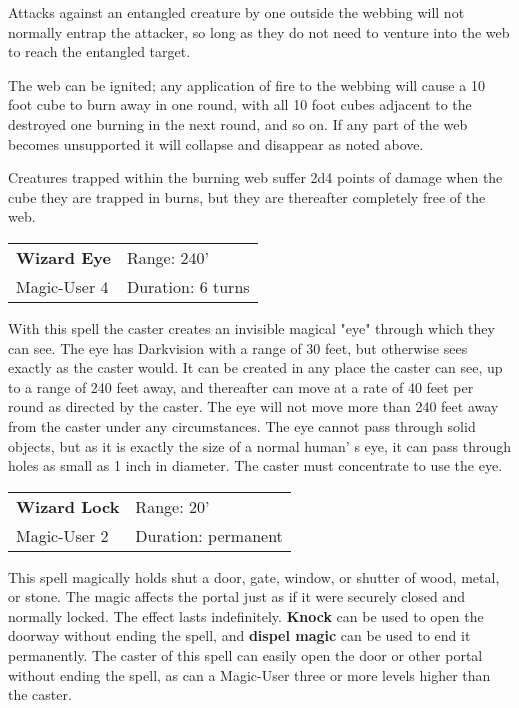 \documentclass[a4paper,twoside,openany,10pt]{book}
\begin{document}
\begin{multicols}{2}
Attacks against an entangled creature by one outside the webbing will not normally entrap the attacker, so long as they do not need to venture into the web to reach the entangled target.

The web can be ignited; any application of fire to the webbing will cause a 10 foot cube to burn away in one round, with all 10 foot cubes adjacent to the destroyed one burning in the next round, and so on. If any part of the web becomes unsupported it will collapse and disappear as noted above.

Creatures trapped within the burning web suffer 2d4 points of damage when the cube they are trapped in burns, but they are thereafter completely free of the web.

\smallskip\begin{flushleft} 
	\begin{tabularx}{0.45\textwidth}{@{}m{3.5cm}m{5.5cm}@{}} 
		\textbf{Wizard Eye} & Range: 240'\\
		Magic-User 4 &Duration: 6 turns\\
	\end{tabularx}\end{flushleft}

With this spell the caster creates an invisible magical "eye" through which they can see. The eye has Darkvision with a range of 30 feet, but otherwise sees exactly as the caster would. It can be created in any place the caster can see, up to a range of 240 feet away, and thereafter can move at a rate of 40 feet per round as directed by the caster. The eye will not move more than 240 feet away from the caster under any circumstances. The eye cannot pass through solid objects, but as it is exactly the size of a normal human' s eye, it can pass through holes as small as 1 inch in diameter. The caster must concentrate to use the eye.

\smallskip\begin{flushleft} 
	\begin{tabularx}{0.45\textwidth}{@{}m{3.5cm}m{5.5cm}@{}} 
		\textbf{Wizard Lock} & Range: 20'\\
		Magic-User 2 &Duration: permanent\\
	\end{tabularx}\end{flushleft}

This spell magically holds shut a door, gate, window, or shutter of wood, metal, or stone. The magic affects the portal just as if it were securely closed and normally locked. The effect lasts indefinitely. \textbf{Knock} can be used to open the doorway without ending the spell, and \textbf{dispel magic} can be used to end it permanently. The caster of this spell can easily open the door or other portal without ending the spell, as can a Magic-User three or more levels higher than the caster.


\end{multicols}
\end{document}
